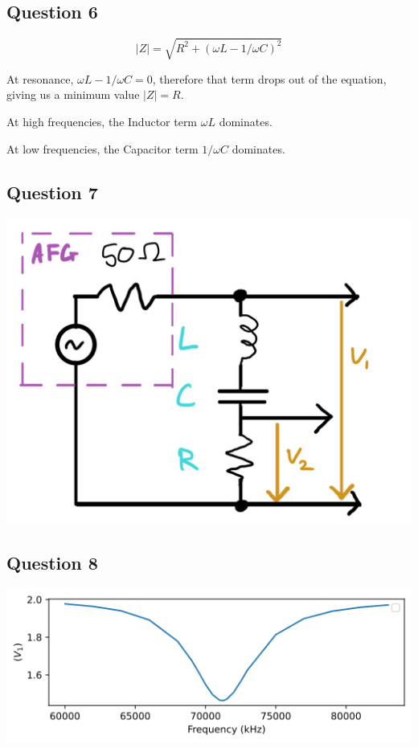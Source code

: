 \documentclass[a4paper]{article}
\begin{document}
\subsection{Question 6}
\begin{equation}
|Z|=\sqrt{R^2+(\omega L-1/\omega C)^2}
\end{equation}

At resonance, $\omega L-1/\omega C=0$, therefore that term drops out of the equation, giving us a minimum value $|Z|=R$.

At high frequencies, the Inductor term $\omega L$ dominates.

At low frequencies, the Capacitor term $1/\omega C$ dominates.

\subsection{Question 7}
\includegraphics[scale=0.2]{circuit.png}

\subsection{Question 8}
\includegraphics[scale=0.8]{v1.png}
\end{document}
